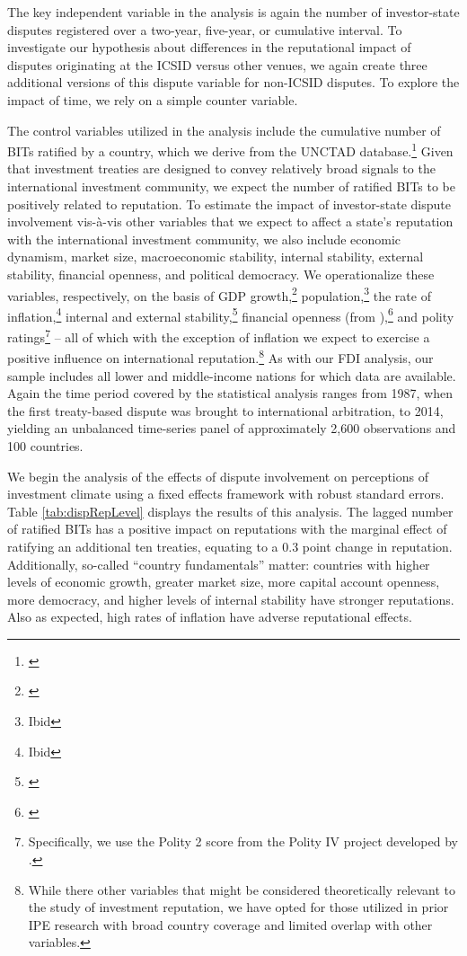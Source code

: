 \documentclass[12pt,onesided]{amsart}
\begin{document}
The key independent variable in the analysis is again the number of investor-state disputes registered over a two-year, five-year, or cumulative interval. To investigate our hypothesis about differences in the reputational impact of disputes originating at the ICSID versus other venues, we again create three additional versions of this dispute variable for non-ICSID disputes. To explore the impact of time, we rely on a simple counter variable.

The control variables utilized in the analysis include the cumulative number of BITs ratified by a country, which we derive from the UNCTAD database.\footnote{\citet{unctad:2013c}} Given that investment treaties are designed to convey relatively broad signals to the international investment community, we expect the number of ratified BITs to be positively related to reputation. To estimate the impact of investor-state dispute involvement vis-\`{a}-vis other variables that we expect to affect a state's reputation with the international investment community, we also include economic dynamism, market size, macroeconomic stability, internal stability, external stability, financial openness, and political democracy. We operationalize these variables, respectively, on the basis of GDP growth,\footnote{\citet{worldbank:2013}} population,\footnote{Ibid} the rate of inflation,\footnote{Ibid} internal and external stability,\footnote{\citet{prs:2013}} financial openness (from \citeauthor{chinn:ito:2008}),\footnote{\citet{chinn:ito:2008}} and polity ratings\footnote{Specifically, we use the Polity 2 score from the Polity IV project developed by \citet{marshall2013polity}.} -- all of which with the exception of inflation we expect to exercise a positive influence on international reputation.\footnote{While there other variables that might be considered theoretically relevant to the study of investment reputation, we have opted for those utilized in prior IPE research with broad country coverage and limited overlap with other variables.} As with our FDI analysis, our sample includes all lower and middle-income nations for which data are available. Again the time period covered by the statistical analysis ranges from 1987, when the first treaty-based dispute was brought to international arbitration, to 2014, yielding an unbalanced time-series panel of approximately 2,600 observations and 100 countries.

We begin the analysis of the effects of dispute involvement on perceptions of investment climate using a fixed effects framework with robust standard errors. Table \ref{tab:dispRepLevel} displays the results of this analysis. The lagged number of ratified BITs has a positive impact on reputations with the marginal effect of ratifying an additional ten treaties, equating to a 0.3 point change in reputation. Additionally, so-called ``country fundamentals'' matter: countries with higher levels of economic growth, greater market size, more capital account openness, more democracy, and higher levels of internal stability have stronger reputations. Also as expected, high rates of inflation have adverse reputational effects.
\end{document}
